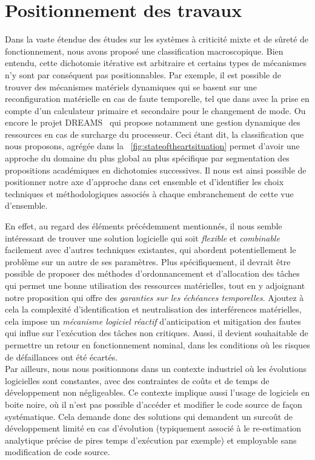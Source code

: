 \documentclass[french, a4paper, 11pt, twoside, pdftex]{StyleThese}
\begin{document}
   \section{Positionnement des travaux}
   
   Dans la vaste étendue des études sur les systèmes à criticité mixte et de sûreté de fonctionnement, nous avons proposé une classification macroscopique. Bien entendu, cette dichotomie itérative est arbitraire et certains types de mécanismes n'y sont par conséquent pas positionnables. Par exemple, il est possible de trouver des mécanismes matériels dynamiques qui se basent sur une reconfiguration matérielle en cas de faute temporelle, tel que dans \cite{lin_scheduling_2015} avec la prise en compte d'un calculateur primaire et secondaire pour le changement de mode. Ou encore le projet DREAMS~\cite{fohler_evaluation_2018} qui propose notamment une gestion dynamique des ressources en cas de surcharge du processeur. Ceci étant dit, la classification que nous proposons, agrégée dans la ~\autoref{fig:stateoftheartsituation} permet d'avoir une approche du domaine du plus global au plus spécifique par segmentation des propositions académiques en dichotomies successives. Il nous est ainsi possible de positionner notre axe d'approche dans cet ensemble et d'identifier les choix techniques et méthodologiques associés à chaque embranchement de cette vue d'ensemble.
   
   En effet, au regard des éléments précédemment mentionnés, il nous semble intéressant de trouver une solution logicielle qui soit \textit{flexible} et \textit{combinable} facilement avec d'autres techniques existantes, qui abordent potentiellement le problème sur un autre de ses paramètres. Plus spécifiquement, il devrait être possible de proposer des méthodes d'ordonnancement et d'allocation des tâches qui permet une bonne utilisation des ressources matérielles, tout en y adjoignant notre proposition qui offre des \textit{garanties sur les échéances temporelles}. 
   Ajoutez à cela la complexité d'identification et neutralisation des interférences matérielles, cela impose un \textit{mécanisme logiciel réactif} d'anticipation et mitigation des fautes qui influe sur l'exécution des tâches non critiques. 
   Aussi, il devient souhaitable de permettre un retour en fonctionnement nominal, dans les conditions où les risques de défaillances ont été écartés. 
   \\
   \smallbreak
   Par ailleurs, nous nous positionnons dans un contexte industriel où les évolutions logicielles sont constantes, avec des contraintes de coûts et de temps de développement non négligeables. Ce contexte implique aussi l'usage de logiciels en boite noire, où il n'est pas possible d'accéder et modifier le code source de façon systématique. Cela demande donc des solutions qui demandent un surcoût de développement limité en cas d'évolution (typiquement associé à le re-estimation analytique précise de pires temps d'exécution par exemple) et employable sans modification de code source.
   
\end{document}
